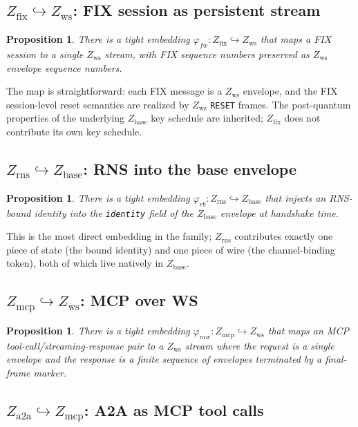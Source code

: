 \documentclass[11pt]{article}
\newtheorem{proposition}[theorem]{Proposition}
\theoremstyle{definition}
\theoremstyle{remark}
\newcommand{\Zb}{Z_{\mathrm{base}}}
\newcommand{\Zw}{Z_{\mathrm{ws}}}
\newcommand{\Zf}{Z_{\mathrm{fix}}}
\newcommand{\Zr}{Z_{\mathrm{rns}}}
\newcommand{\Zm}{Z_{\mathrm{mcp}}}
\newcommand{\Za}{Z_{\mathrm{a2a}}}
\begin{document}
\subsection{$\Zf \hookrightarrow \Zw$: FIX session as persistent stream}

\begin{proposition}
\label{prop:fix-ws}
There is a tight embedding $\varphi_{fw} : \Zf \hookrightarrow \Zw$
that maps a FIX session to a single $\Zw$ stream, with FIX sequence
numbers preserved as $\Zw$ envelope sequence numbers.
\end{proposition}

The map is straightforward: each FIX message is a $\Zw$ envelope, and
the FIX session-level reset semantics are realized by $\Zw$
\texttt{RESET} frames. The post-quantum properties of the underlying
$\Zb$ key schedule are inherited; $\Zf$ does not contribute its own
key schedule.

\subsection{$\Zr \hookrightarrow \Zb$: RNS into the base envelope}

\begin{proposition}
\label{prop:rns-base}
There is a tight embedding $\varphi_{rb} : \Zr \hookrightarrow \Zb$
that injects an RNS-bound identity into the \texttt{identity} field
of the $\Zb$ envelope at handshake time.
\end{proposition}

This is the most direct embedding in the family; $\Zr$ contributes
exactly one piece of state (the bound identity) and one piece of wire
(the channel-binding token), both of which live natively in $\Zb$.

\subsection{$\Zm \hookrightarrow \Zw$: MCP over WS}

\begin{proposition}
\label{prop:mcp-ws}
There is a tight embedding $\varphi_{mw} : \Zm \hookrightarrow \Zw$
that maps an MCP tool-call/streaming-response pair to a $\Zw$ stream
where the request is a single envelope and the response is a finite
sequence of envelopes terminated by a final-frame marker.
\end{proposition}

\subsection{$\Za \hookrightarrow \Zm$: A2A as MCP tool calls}
\end{document}
